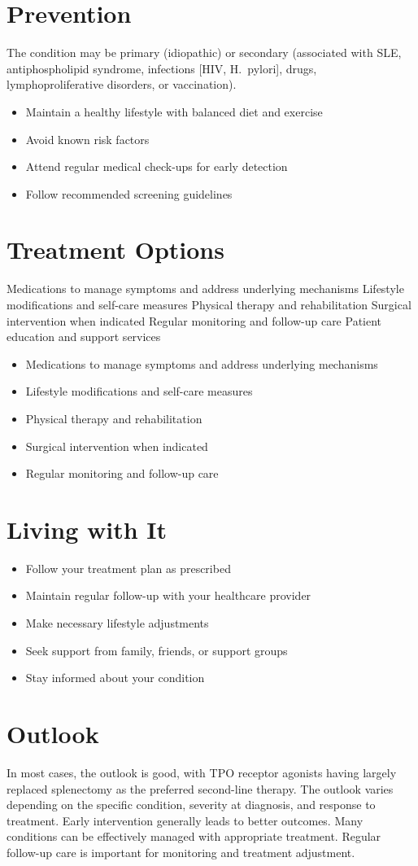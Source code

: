 \section{Prevention}
The condition may be primary (idiopathic) or secondary (associated with SLE, antiphospholipid syndrome, infections [HIV, H.~pylori], drugs, lymphoproliferative disorders, or vaccination).

\begin{itemize}[noitemsep]
  \item Maintain a healthy lifestyle with balanced diet and exercise
  \item Avoid known risk factors
  \item Attend regular medical check-ups for early detection
  \item Follow recommended screening guidelines
\end{itemize}
\section{Treatment Options}
Medications to manage symptoms and address underlying mechanisms Lifestyle modifications and self-care measures Physical therapy and rehabilitation Surgical intervention when indicated Regular monitoring and follow-up care Patient education and support services

\begin{itemize}[noitemsep]
  \item Medications to manage symptoms and address underlying mechanisms
  \item Lifestyle modifications and self-care measures
  \item Physical therapy and rehabilitation
  \item Surgical intervention when indicated
  \item Regular monitoring and follow-up care
\end{itemize}
\section{Living with It}
\begin{itemize}[noitemsep]
  \item Follow your treatment plan as prescribed
  \item Maintain regular follow-up with your healthcare provider
  \item Make necessary lifestyle adjustments
  \item Seek support from family, friends, or support groups
  \item Stay informed about your condition
\end{itemize}
\section{Outlook}
In most cases, the outlook is good, with TPO receptor agonists having largely replaced splenectomy as the preferred second-line therapy. The outlook varies depending on the specific condition, severity at diagnosis, and response to treatment. Early intervention generally leads to better outcomes. Many conditions can be effectively managed with appropriate treatment. Regular follow-up care is important for monitoring and treatment adjustment.
